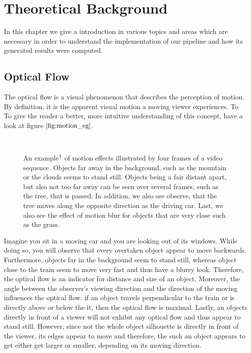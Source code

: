 \chapter{Theoretical Background}
In this chapter we give a introduction in various topics and areas which are necessary in order to understand the implementation of our pipeline and how its generated results were computed. 

\section{Optical Flow}
\label{sec:optical_flow}
The optical flow is a visual phenomenon that describes the perception of motion.
By definition, it is the apparent visual motion a moving viewer experiences. To To give the reader a better, more intuitive understanding of this concept, have a look at figure $\ref{fig:motion_eg}$.
\begin{figure}[H]
\begin{center}
~
\end{center}
\caption[Motion Example]{An example$\footnotemark$ of motion effects illustrated by four frames of a video sequence. Objects far away in the background, such as the mountain or the clouds seems to stand still. Objects being a fair distant apart, but also not too far away can be seen over several frames, such as the tree, that is passed. In addition, we also see observe, that the tree moves along the opposite direction as the driving car. Last, we also see the effect of motion blur for objects that are very close such as the grass.}
\label{fig:motion_eg}
\end{figure}
Imagine you sit in a moving car and you are looking out of its windows. While doing so, you will observe that every overtaken object appear to move backwards. Furthermore, objects far in the background seem to stand still, whereas object close to the train seem to move very fast and thus have a blurry look. Therefore, the optical flow is an indicator for distance and size of an object. Moreover, the angle between the observer's viewing direction and the direction of the moving influences the optical flow. if an object travels perpendicular to the train or is directly above or below the it, then the optical flow is maximal. Lastly, an objects directly in front of a viewer will not exhibit any optical flow and thus appear to stand still. However, since not the whole object silhouette is directly in front of the viewer, its edges appear to move and therefore, the such an object appears to get either get larger or smaller, depending on its moving direction.

